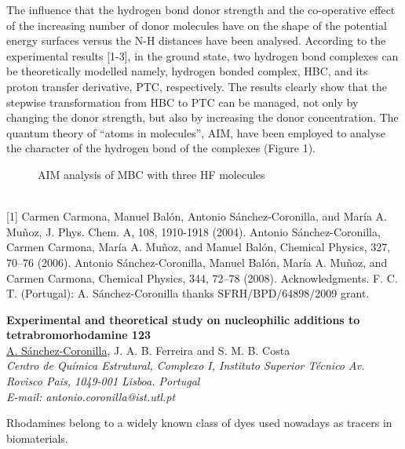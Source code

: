 The influence that the hydrogen bond donor strength and the co-operative
effect of the increasing number of donor molecules have on the shape of the potential
energy surfaces versus the N-H distances have been analysed. According to the
experimental results [1-3], in the ground state, two hydrogen bond complexes can be
theoretically modelled namely, hydrogen bonded complex, HBC, and its proton
transfer derivative, PTC, respectively. The results clearly show that the stepwise
transformation from HBC to PTC can be managed, not only by changing the donor
strength, but also by increasing the donor concentration. The quantum theory of
“atoms in molecules”, AIM, have been employed to analyse the character of the
hydrogen bond of the complexes (Figure 1).
\\
\begin{figure}[h]
 \centerline{}
 \caption[]{AIM analysis of MBC with three HF molecules}\label{figure 1}
\end{figure}
\\
{\footnotesize
[1] Carmen Carmona, Manuel Balón, Antonio Sánchez-Coronilla, and María A. Muñoz, J. Phys.
Chem. A, 108, 1910-1918 (2004).
\newline
[2] Antonio Sánchez-Coronilla, Carmen Carmona, María A. Muñoz, and Manuel Balón, Chemical
Physics, 327, 70–76 (2006).
\newline
[3] Antonio Sánchez-Coronilla, Manuel Balón, María A. Muñoz, and Carmen Carmona, Chemical
Physics, 344, 72–78 (2008).
\newline
Acknowledgments. F. C. T. (Portugal): A. Sánchez-Coronilla thanks SFRH/BPD/64898/2009 grant.
}

\newpage
\setcounter{figure}{0}
\begin{center}
{\bf \Large
Experimental and theoretical study on nucleophilic
additions to tetrabromorhodamine 123
}
\\
\vspace{0.5cm}
\underline{A. Sánchez-Coronilla}, J. A. B. Ferreira and S. M. B. Costa
\\
\vspace{0.5cm}
{\it
Centro de Química Estrutural, Complexo I, Instituto Superior Técnico
Av. Rovisco Pais, 1049-001 Lisboa. Portugal
}
\\
\vspace{0.5cm}
{\it E-mail: antonio.coronilla@ist.utl.pt}
\\
\vspace{0.5cm}
\end{center}
Rhodamines belong to a widely known class of dyes used nowadays as
tracers in biomaterials.

